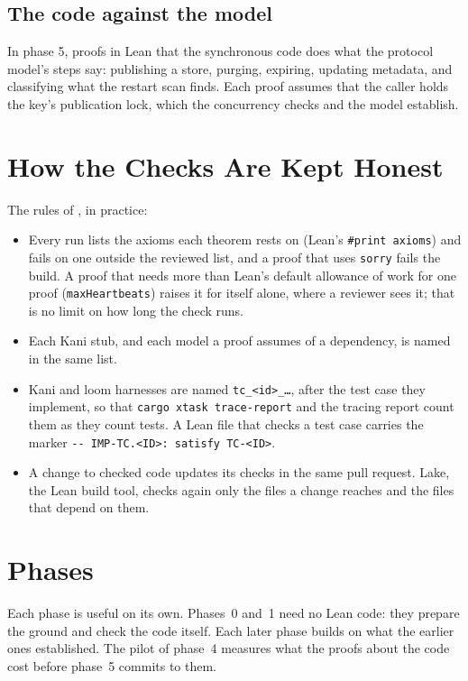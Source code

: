 \subsection{The code against the model}

In phase 5, proofs in Lean that the synchronous code does what the protocol
model's steps say: publishing a store, purging, expiring, updating
metadata, and classifying what the restart scan finds. Each proof assumes
that the caller holds the key's publication lock, which the concurrency
checks and the model establish.

\section{How the Checks Are Kept Honest}
\label{app:verification-rules}

The rules of , in practice:
\begin{itemize}
  \item Every run lists the axioms each theorem rests on (Lean's
    \texttt{\#print axioms}) and fails on one outside the reviewed list, and
    a proof that uses \texttt{sorry} fails the build. A proof that needs
    more than Lean's default allowance of work for one proof
    (\texttt{maxHeartbeats}) raises it for itself alone, where a reviewer
    sees it; that is no limit on how long the check runs.
  \item Each Kani stub, and each model a proof assumes of a dependency, is
    named in the same list.
  \item Kani and loom harnesses are named \texttt{tc\_<id>\_\ldots}, after
    the test case they implement, so that \texttt{cargo xtask trace-report}
    and the tracing report count them as they count tests. A Lean file that
    checks a test case carries the marker
    \texttt{-{}- IMP-TC.<ID>: satisfy TC-<ID>}.
  \item A change to checked code updates its checks in the same pull
    request. Lake, the Lean build tool, checks again only the files a change
    reaches and the files that depend on them.
\end{itemize}

\section{Phases}
\label{app:verification-phases}

Each phase is useful on its own. Phases~0 and~1 need no Lean code: they
prepare the ground and check the code itself. Each later phase builds on
what the earlier ones established.
The pilot of phase~4 measures what the proofs about the code cost before
phase~5 commits to them.


